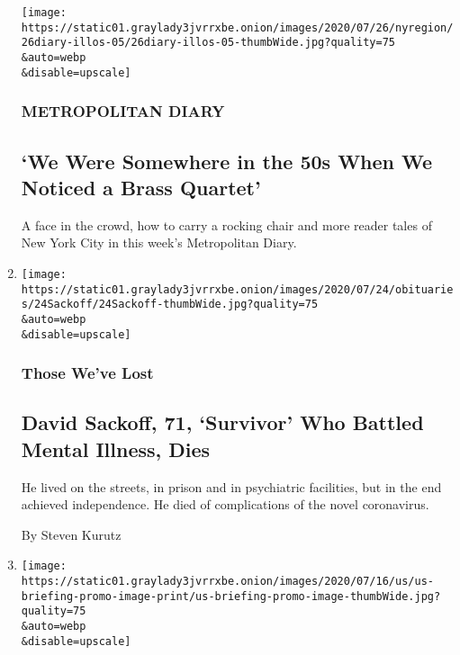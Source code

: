 \begin{enumerate}
  \texttt{[image: https://static01.graylady3jvrrxbe.onion/images/2020/07/26/nyregion/26diary-illos-05/26diary-illos-05-thumbWide.jpg?quality=75\\\&auto=webp\\\&disable=upscale]}

  \hypertarget{metropolitan-diary}{%
  \subsubsection{METROPOLITAN DIARY}\label{metropolitan-diary}}

  \hypertarget{we-were-somewhere-in-the-50s-when-we-noticed-a-brass-quartet}{%
  \subsection{`We Were Somewhere in the 50s When We Noticed a Brass
  Quartet'}\label{we-were-somewhere-in-the-50s-when-we-noticed-a-brass-quartet}}

  A face in the crowd, how to carry a rocking chair and more reader
  tales of New York City in this week's Metropolitan Diary.
\item
  \href{/2020/07/25/obituaries/david-sackoff-dead-coronavirus.html}{}

  \texttt{[image: https://static01.graylady3jvrrxbe.onion/images/2020/07/24/obituaries/24Sackoff/24Sackoff-thumbWide.jpg?quality=75\\\&auto=webp\\\&disable=upscale]}

  \hypertarget{those-weve-lost}{%
  \subsubsection{Those We've Lost}\label{those-weve-lost}}

  \hypertarget{david-sackoff-71-survivor-who-battled-mental-illness-dies}{%
  \subsection{David Sackoff, 71, `Survivor' Who Battled Mental Illness,
  Dies}\label{david-sackoff-71-survivor-who-battled-mental-illness-dies}}

  He lived on the streets, in prison and in psychiatric facilities, but
  in the end achieved independence. He died of complications of the
  novel coronavirus.

  By Steven Kurutz
\item
  \href{/2020/07/25/world/coronavirus-covid-19.html}{}

  \texttt{[image: https://static01.graylady3jvrrxbe.onion/images/2020/07/16/us/us-briefing-promo-image-print/us-briefing-promo-image-thumbWide.jpg?quality=75\\\&auto=webp\\\&disable=upscale]}


\end{enumerate}
